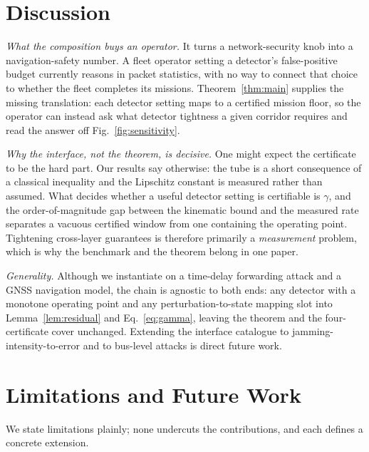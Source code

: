 \section{Discussion}
\label{sec:discussion}
\emph{What the composition buys an operator.} It turns a network-security knob
into a navigation-safety number. A fleet operator setting a detector's
false-positive budget currently reasons in packet statistics, with no way to
connect that choice to whether the fleet completes its missions.
Theorem~\ref{thm:main} supplies the
missing translation: each detector setting maps to a certified mission floor, so
the operator can instead ask what detector tightness a given corridor requires
and read the answer off Fig.~\ref{fig:sensitivity}.

\emph{Why the interface, not the theorem, is decisive.} One might expect the
certificate to be the hard part. Our results say otherwise: the tube is a short
consequence of a classical inequality and the Lipschitz constant is measured
rather than assumed. What decides whether a useful detector setting is
certifiable is $\gamma$, and the order-of-magnitude gap between the kinematic
bound and the measured rate separates a vacuous certified window from one
containing the operating point. Tightening cross-layer guarantees is therefore
primarily a \emph{measurement} problem, which is why the benchmark and the
theorem belong in one paper.

\emph{Generality.} Although we instantiate on a time-delay forwarding attack and
a GNSS navigation model, the chain is agnostic to both ends: any detector with a
monotone operating point and any perturbation-to-state mapping slot into
Lemma~\ref{lem:residual} and Eq.~\eqref{eq:gamma}, leaving the theorem and the
four-certificate cover unchanged. Extending the interface catalogue to
jamming-intensity-to-error and to bus-level attacks is direct future work.

\section{Limitations and Future Work}
\label{sec:limitations}
We state limitations plainly; none undercuts the contributions, and each defines
a concrete extension.

